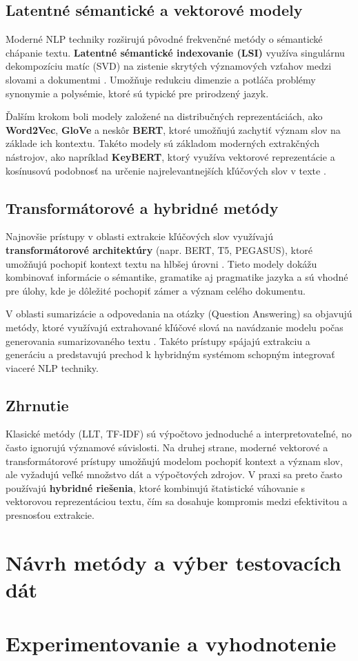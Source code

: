 \documentclass[a4paper,12pt]{article}
\begin{document}
\subsection{Latentné sémantické a vektorové modely}

Moderné NLP techniky rozširujú pôvodné frekvenčné metódy o sémantické chápanie textu. \textbf{Latentné sémantické indexovanie (LSI)} využíva singulárnu dekompozíciu matíc (SVD) na zistenie skrytých významových vzťahov medzi slovami a dokumentmi \cite{deerwester1990indexing}. Umožňuje redukciu dimenzie a potláča problémy synonymie a polysémie, ktoré sú typické pre prirodzený jazyk.

Ďalším krokom boli modely založené na distribučných reprezentáciách, ako \textbf{Word2Vec}, \textbf{GloVe} a neskôr \textbf{BERT}, ktoré umožňujú zachytiť význam slov na základe ich kontextu. Takéto modely sú základom moderných extrakčných nástrojov, ako napríklad \textbf{KeyBERT}, ktorý využíva vektorové reprezentácie a kosínusovú podobnosť na určenie najrelevantnejších kľúčových slov v texte \cite{grootendorst2020keybert}.

\subsection{Transformátorové a hybridné metódy}

Najnovšie prístupy v oblasti extrakcie kľúčových slov využívajú \textbf{transformátorové architektúry} (napr. BERT, T5, PEGASUS), ktoré umožňujú pochopiť kontext textu na hlbšej úrovni \cite{devlin2019bert, lewis2020bart, zhang2020pegasus}. Tieto modely dokážu kombinovať informácie o sémantike, gramatike aj pragmatike jazyka a sú vhodné pre úlohy, kde je dôležité pochopiť zámer a význam celého dokumentu.

V oblasti sumarizácie a odpovedania na otázky (Question Answering) sa objavujú metódy, ktoré využívajú extrahované kľúčové slová na navádzanie modelu počas generovania sumarizovaného textu \cite{grootendorst2020keybert}. Takéto prístupy spájajú extrakciu a generáciu a predstavujú prechod k hybridným systémom schopným integrovať viaceré NLP techniky.

\subsection{Zhrnutie}

Klasické metódy (LLT, TF-IDF) sú výpočtovo jednoduché a interpretovateľné, no často ignorujú významové súvislosti. Na druhej strane, moderné vektorové a transformátorové prístupy umožňujú modelom pochopiť kontext a význam slov, ale vyžadujú veľké množstvo dát a výpočtových zdrojov. V praxi sa preto často používajú \textbf{hybridné riešenia}, ktoré kombinujú štatistické váhovanie s vektorovou reprezentáciou textu, čím sa dosahuje kompromis medzi efektivitou a presnosťou extrakcie.



\section{Návrh metódy a výber testovacích dát}

\section{Experimentovanie a vyhodnotenie}

\printbibliography
\end{document}
